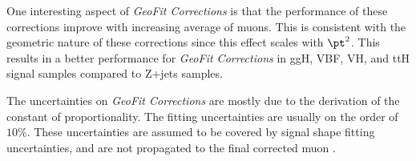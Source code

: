 One interesting aspect of \textit{GeoFit Corrections} is that the performance of these corrections improve with increasing average \pt of muons. This is consistent with the geometric nature of these corrections since this effect scales with $\pt^2$. This results in a better performance for \textit{GeoFit Corrections} in ggH, VBF, VH, and ttH signal samples compared to Z+jets samples.

The uncertainties on \textit{GeoFit Corrections} are mostly due to the derivation of the constant of proportionality. The fitting uncertainties are usually on the order of $10\%$. These uncertainties are assumed to be covered by signal shape fitting uncertainties, and are not propagated to the final corrected muon \pt.









